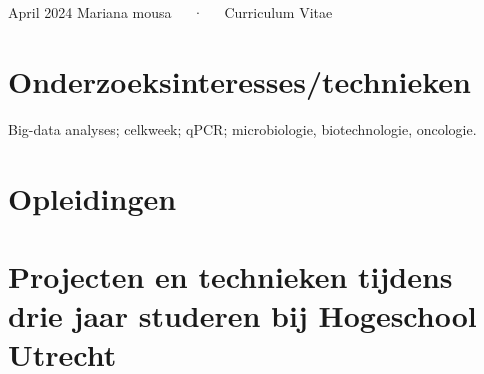 \documentclass[11pt,a4paper,]{awesome-cv}
\begin{document}
\makecvheader

\makecvfooter
  {April 2024}
    {Mariana mousa~~~·~~~Curriculum Vitae}
  {\thepage}





\hypertarget{onderzoeksinteressestechnieken}{%
\section{Onderzoeksinteresses/technieken}\label{onderzoeksinteressestechnieken}}

Big-data analyses; celkweek; qPCR; microbiologie, biotechnologie,
oncologie.

\hypertarget{opleidingen}{%
\section{Opleidingen}\label{opleidingen}}

\begin{cventries}
    \vspace{-4.0mm}
    \vspace{-4.0mm}
    \vspace{-4.0mm}
\end{cventries}

\hypertarget{projecten-en-technieken-tijdens-drie-jaar-studeren-bij-hogeschool-utrecht}{%
\section{Projecten en technieken tijdens drie jaar studeren bij
Hogeschool
Utrecht}\label{projecten-en-technieken-tijdens-drie-jaar-studeren-bij-hogeschool-utrecht}}
\end{document}
